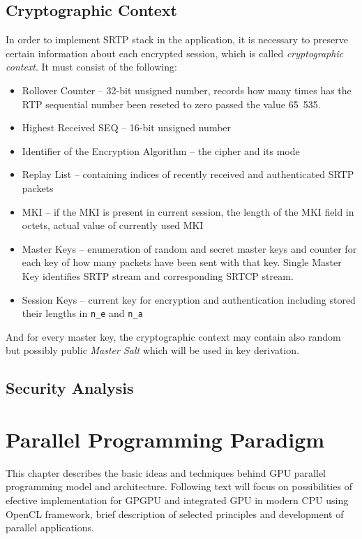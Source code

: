 \section{Cryptographic Context}
In order to implement SRTP stack in the application, it is necessary to
preserve certain information about each encrypted session, which is 
called \textit{cryptographic context}. It must consist of the following:

\begin{itemize}
\item Rollover Counter -- 32-bit unsigned number, records how many times 
has the RTP sequential number been reseted to zero passed the value 65~535.
\item Highest Received SEQ -- 16-bit unsigned number
\item Identifier of the Encryption Algorithm -- the cipher and its mode
\item Replay List -- containing indices of recently received and 
authenticated SRTP packets
\item MKI -- if the MKI is present in current session, the length
of the MKI field in octets, actual value of currently used MKI
\item Master Keys -- enumeration of random and secret master keys
and counter for each key of how many packets have been sent with
that key. Single Master Key identifies SRTP stream and corresponding SRTCP
stream.
\item Session Keys -- current key for encryption and authentication
including stored their lengths in \texttt{n\_e} and \texttt{n\_a}
\end{itemize}

And for every master key, the cryptographic context may contain also
random but possibly public \textit{Master Salt} which will be used in 
key derivation.

\section{Security Analysis}



\chapter{Parallel Programming Paradigm}
This chapter describes the basic ideas and techniques behind GPU parallel 
programming model and architecture. Following text will focus on possibilities
of efective implementation for GPGPU and integrated GPU in modern CPU using 
OpenCL framework, brief description of selected principles and development of
parallel applications. 

